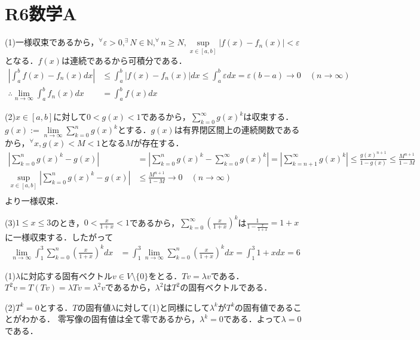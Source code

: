 \documentclass[
		book,
		head_space=20mm,
		foot_space=20mm,
		gutter=10mm,
		line_length=190mm
]{jlreq}
\begin{document}
\section{R6数学A}
(1)一様収束であるから，$^\forall \varepsilon > 0,^\exists N \in \mathbb{N},^\forall n \ge N,\sup\limits_{x\in [a,b]}|f(x)-f_n(x)|<\varepsilon$となる．$f(x)$は連続であるから可積分である．
\begin{align}
	\left|\int_a^b f(x)-f_n(x)dx\right| &\le \int_a^b |f(x)-f_n(x)|dx\le \int_a^b \varepsilon dx = \varepsilon(b-a)\rightarrow 0 \quad (n\rightarrow \infty)\\
	\therefore \lim_{n\rightarrow \infty}\int_a^b f_n(x)dx &= \int_a^b f(x)dx
\end{align}

(2)$x\in [a,b]$に対して$0<g(x)<1$であるから，$\sum\limits_{k=0}^\infty g(x)^k$は収束する．
$g(x):= \lim\limits_{n\rightarrow \infty} \sum\limits_{k=0}^n g(x)^k$とする．$g(x)$は有界閉区間上の連続関数であるから，$^\forall x ,g(x)<M<1$となる$M$が存在する．
\begin{align}
	\left|\sum_{k=0}^n g(x)^k - g(x)\right| &= \left|\sum_{k=0}^n g(x)^k - \sum_{k=0}^\infty g(x)^k\right|= \left|\sum_{k=n+1}^\infty g(x)^k\right|\le \frac{g(x)^{n+1}}{1-g(x)}\le \frac{M^{n+1}}{1-M}\\
	\sup_{x\in [a,b]}\left|\sum_{k=0}^n g(x)^k - g(x)\right| &\le \frac{M^{n+1}}{1-M}\rightarrow 0 \quad (n\rightarrow \infty)\\
\end{align}
より一様収束．

(3)$1\le x\le 3$のとき，$0<\frac{x}{1+x}<1$であるから，$\sum\limits_{k=0}^\infty \left( \frac{x}{1+x} \right)^k$は$\frac{1}{1-\frac{x}{1+x}}=1+x$に一様収束する．したがって
\begin{align}
	\lim_{n\rightarrow \infty} \int_1^3 \sum_{k=0}^n\left( \frac{x}{1+x} \right)^k dx &= \int_1^3 \lim_{n\rightarrow \infty} \sum_{k=0}^n\left( \frac{x}{1+x} \right)^k dx= \int_1^3 1+x dx = 6
\end{align}

(1)$\lambda$に対応する固有ベクトル$v \in V\setminus\{0\}$をとる．$Tv=\lambda v$である．$T^2 v=T(Tv)=\lambda Tv=\lambda^2v$であるから，$\lambda^2$は$T^2$の固有ベクトルである．

(2)$T^k=0$とする．$T$の固有値$\lambda$に対して(1)と同様にして$\lambda^k$が$T^k$の固有値であることがわかる．
零写像の固有値は全て零であるから，$\lambda^k=0$である．よって$\lambda=0$である．
\end{document}
